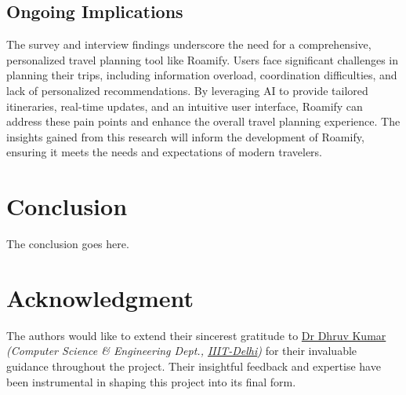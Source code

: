 \documentclass[conference]{IEEEtran}
\begin{document}
    \subsection{Ongoing Implications}
        The survey and interview findings underscore the need for a comprehensive, personalized travel planning tool like Roamify. Users face significant challenges in planning their trips, including information overload, coordination difficulties, and lack of personalized recommendations. By leveraging AI to provide tailored itineraries, real-time updates, and an intuitive user interface, Roamify can address these pain points and enhance the overall travel planning experience. The insights gained from this research will inform the development of Roamify, ensuring it meets the needs and expectations of modern travelers.
        











\section{Conclusion}
The conclusion goes here.





\section*{Acknowledgment}
    The authors would like to extend their sincerest gratitude to \href{https://www.iiitd.ac.in/dhruv}{Dr Dhruv Kumar} \textit{(Computer Science \& Engineering Dept., \href{https://www.iiitd.ac.in/}{IIIT-Delhi})} for their invaluable guidance throughout the project.
    Their insightful feedback and expertise have been instrumental in shaping this project into its final form.
\end{document}
